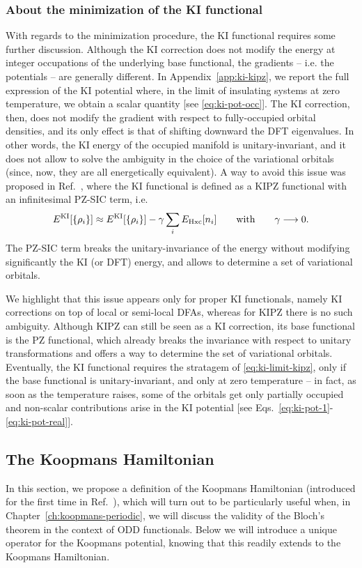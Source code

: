 \subsubsection*{About the minimization of the KI functional}
With regards to the minimization procedure, the KI functional requires some further discussion. Although the KI correction does not modify the energy at integer occupations of the underlying base functional, the gradients -- i.e. the potentials -- are generally different. In Appendix~\ref{app:ki-kipz}, we report the full expression of the KI potential where, in the limit of insulating systems at zero temperature, we obtain a scalar quantity [see \cref{eq:ki-pot-occ}]. The KI correction, then, does not modify the gradient with respect to fully-occupied orbital densities, and its only effect is that of shifting downward the DFT eigenvalues. In other words, the KI energy of the occupied manifold is unitary-invariant, and it does not allow to solve the ambiguity in the choice of the variational orbitals (since, now, they are all energetically equivalent). A way to avoid this issue was proposed in Ref.~\cite{borghi_koopmans-compliant_2014}, where the KI functional is defined as a KIPZ functional with an infinitesimal PZ-SIC term, i.e.
%
\begin{equation}
    E^{\rm KI}[\{ \rho_i \}] \approx E^{\rm KI}[\{ \rho_i \}] - \gamma \sum_i E_{\rm Hxc}[n_i]
    \qquad \text{with} \qquad \gamma \longrightarrow 0 .
    \label{eq:ki-limit-kipz}
\end{equation}
%
The PZ-SIC term breaks the unitary-invariance of the energy without modifying significantly the KI (or DFT) energy, and allows to determine a set of variational orbitals.

We highlight that this issue appears only for proper KI functionals, namely KI corrections on top of local or semi-local DFAs, whereas for KIPZ there is no such ambiguity. Although KIPZ can still be seen as a KI correction, its base functional is the PZ functional, which already breaks the invariance with respect to unitary transformations and offers a way to determine the set of variational orbitals. Eventually, the KI functional requires the stratagem of \cref{eq:ki-limit-kipz}, only if the base functional is unitary-invariant, and only at zero temperature -- in fact, as soon as the temperature raises, some of the orbitals get only partially occupied and non-scalar contributions arise in the KI potential [see Eqs.~\eqref{eq:ki-pot-1}-\eqref{eq:ki-pot-real}].

\subsection{The Koopmans Hamiltonian\label{sec:koopmans-hamiltonian}}
In this section, we propose a definition of the Koopmans Hamiltonian (introduced for the first time in Ref.~\cite{de_gennaro_blochs_2022}), which will turn out to be particularly useful when, in Chapter~\ref{ch:koopmans-periodic}, we will discuss the validity of the Bloch's theorem in the context of ODD functionals. Below we will introduce a unique operator for the Koopmans potential, knowing that this readily extends to the Koopmans Hamiltonian.

